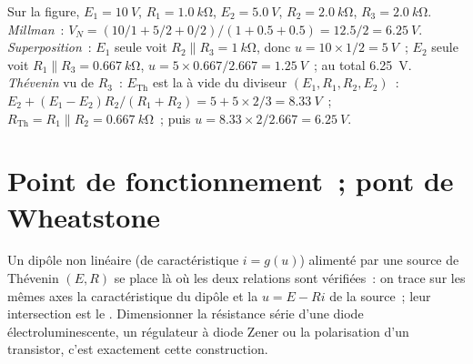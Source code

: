 \begin{example}\label{ex:b1:dc-circuits:threeways}
Sur la figure, $E_1 = \qty{10}{V}$, $R_1 = \qty{1.0}{k\ohm}$, $E_2 =
\qty{5.0}{V}$, $R_2 = \qty{2.0}{k\ohm}$, $R_3 = \qty{2.0}{k\ohm}$.
\emph{Millman}~: $V_N = (10/1 + 5/2 + 0/2)/(1 + 0.5 + 0.5) = 12.5/2 =
\qty{6.25}{V}$. \emph{Superposition}~: $E_1$ seule voit $R_2 \parallel
R_3 = \qty{1}{k\ohm}$, donc $u = 10 \times 1/2 = \qty{5}{V}$~; $E_2$ seule
voit $R_1 \parallel R_3 = \qty{0.667}{k\ohm}$, $u = 5 \times 0.667/2.667
= \qty{1.25}{V}$~; au total \qty{6.25}{V}. \emph{Thévenin} vu de
$R_3$~: $E_{\mathrm{Th}}$ est la  à vide du diviseur
$(E_1, R_1, R_2, E_2)$~: $E_2 + (E_1 - E_2)R_2/(R_1 + R_2) = 5 + 5 \times
2/3 = \qty{8.33}{V}$~; $R_{\mathrm{Th}} = R_1 \parallel R_2 =
\qty{0.667}{k\ohm}$~; puis $u = 8.33 \times 2/2.667 = \qty{6.25}{V}$.
\end{example}

\section{Point de fonctionnement~; pont de Wheatstone}

\begin{method}\label{met:b1:dc-circuits:loadline}
Un dipôle non linéaire (de caractéristique $i = g(u)$) alimenté par une
source de Thévenin $(E, R)$ se place là où les deux relations sont
vérifiées~: on trace sur les mêmes axes la caractéristique du dipôle et
la \emph{} $u = E - Ri$ de la source~; leur intersection
est le \emph{}. Dimensionner la résistance série
d'une diode électroluminescente, un régulateur à diode Zener ou la
polarisation d'un transistor, c'est exactement cette construction.
\end{method}

